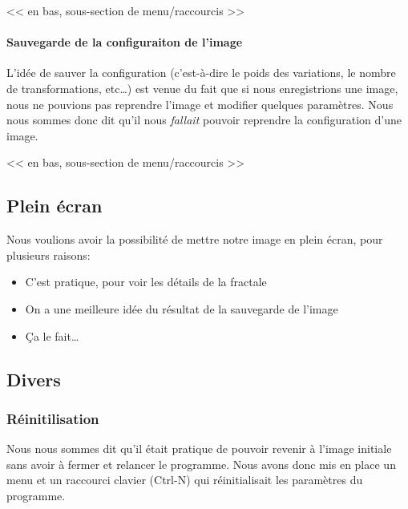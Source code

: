 \documentclass[a4paper]{article}
\begin{document}
<< en bas, sous-section de menu/raccourcis >>
\paragraph{Sauvegarde de la configuraiton de l'image}
L'idée de sauver la configuration (c'est-à-dire le poids des variations, le nombre de transformations, etc\ldots) est venue du fait que si nous enregistrions une image, nous ne pouvions pas reprendre l'image et modifier quelques paramètres. Nous nous sommes donc dit qu'il nous \textit{fallait} pouvoir reprendre la configuration d'une image.

<< en bas, sous-section de menu/raccourcis >>
\subsection*{Plein écran}
Nous voulions avoir la possibilité de mettre notre image en plein écran, pour plusieurs raisons:
\begin{itemize}
\item C'est pratique, pour voir les détails de la fractale
\item On a une meilleure idée du résultat de la sauvegarde de l'image
\item Ça le fait\ldots
\end{itemize}

\subsection*{Divers}
\subsubsection*{Réinitilisation}
Nous nous sommes dit qu'il était pratique de pouvoir revenir à l'image initiale sans avoir à fermer et relancer le programme. Nous avons donc mis en place un menu et un raccourci clavier (Ctrl-N) qui réinitialisait les paramètres du programme.

\subsubsection*{}

\subsubsection*{}

\subsection*{}
\end{document}

